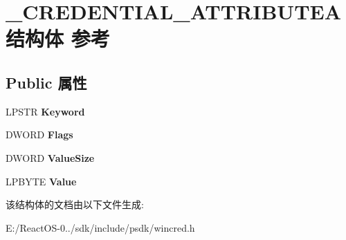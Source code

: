 \hypertarget{struct___c_r_e_d_e_n_t_i_a_l___a_t_t_r_i_b_u_t_e_a}{}\section{\+\_\+\+C\+R\+E\+D\+E\+N\+T\+I\+A\+L\+\_\+\+A\+T\+T\+R\+I\+B\+U\+T\+E\+A结构体 参考}
\label{struct___c_r_e_d_e_n_t_i_a_l___a_t_t_r_i_b_u_t_e_a}
\subsection*{Public 属性}
\begin{DoxyCompactItemize}
\item 
\mbox{\label{struct___c_r_e_d_e_n_t_i_a_l___a_t_t_r_i_b_u_t_e_a_a0c097563f17c45c6cf7e5fca3fb83ef8}} 
L\+P\+S\+TR {\bfseries Keyword}
\item 
\mbox{\label{struct___c_r_e_d_e_n_t_i_a_l___a_t_t_r_i_b_u_t_e_a_ae1cbb065bd1f38ceab568ba452ca6d01}} 
D\+W\+O\+RD {\bfseries Flags}
\item 
\mbox{\label{struct___c_r_e_d_e_n_t_i_a_l___a_t_t_r_i_b_u_t_e_a_ad928e2464095397b5a2ea8b47f46ffa2}} 
D\+W\+O\+RD {\bfseries Value\+Size}
\item 
\mbox{\label{struct___c_r_e_d_e_n_t_i_a_l___a_t_t_r_i_b_u_t_e_a_a8fa2537d12918aae1a75bcc08f96933d}} 
L\+P\+B\+Y\+TE {\bfseries Value}
\end{DoxyCompactItemize}


该结构体的文档由以下文件生成\+:\begin{DoxyCompactItemize}
\item 
E\+:/\+React\+O\+S-\/0../sdk/include/psdk/wincred.\+h\end{DoxyCompactItemize}
